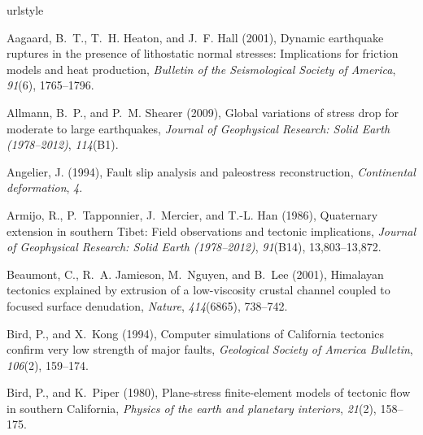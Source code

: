 \documentclass[twocolumn,jgrga]{AGUTeX}
\begin{document}
\begin{article}
{{\begin{thebibliography}{85}
\providecommand{\natexlab}[1]{#1}
\expandafter\ifx\csname urlstyle\endcsname\relax
  \providecommand{\doi}[1]{doi:\discretionary{}{}{}#1}\else
  \providecommand{\doi}{doi:\discretionary{}{}{}\begingroup
  \urlstyle{rm}\Url}\fi

Aagaard, B.~T., T.~H. Heaton, and J.~F. Hall (2001), Dynamic earthquake
  ruptures in the presence of lithostatic normal stresses: {I}mplications for
  friction models and heat production, \textit{Bulletin of the Seismological
  Society of America}, \textit{91}(6), 1765--1796.

Allmann, B.~P., and P.~M. Shearer (2009), Global variations of stress drop for
  moderate to large earthquakes, \textit{Journal of Geophysical Research: Solid
  Earth (1978--2012)}, \textit{114}(B1).

Angelier, J. (1994), Fault slip analysis and paleostress reconstruction,
  \textit{Continental deformation}, \textit{4}.

Armijo, R., P.~Tapponnier, J.~Mercier, and T.-L. Han (1986), Quaternary
  extension in southern {T}ibet: {F}ield observations and tectonic
  implications, \textit{Journal of Geophysical Research: Solid Earth
  (1978--2012)}, \textit{91}(B14), 13,803--13,872.

Beaumont, C., R.~A. Jamieson, M.~Nguyen, and B.~Lee (2001), Himalayan tectonics
  explained by extrusion of a low-viscosity crustal channel coupled to focused
  surface denudation, \textit{Nature}, \textit{414}(6865), 738--742.

Bird, P., and X.~Kong (1994), Computer simulations of {C}alifornia tectonics
  confirm very low strength of major faults, \textit{Geological Society of
  America Bulletin}, \textit{106}(2), 159--174.

Bird, P., and K.~Piper (1980), Plane-stress finite-element models of tectonic
  flow in southern {C}alifornia, \textit{Physics of the earth and planetary
  interiors}, \textit{21}(2), 158--175.


\end{thebibliography}}}
\end{article}
\end{document}
